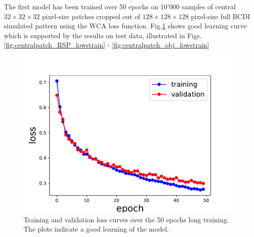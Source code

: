The first model has been trained over 50 epochs on 10'000 samples of central $32\times32\times32$ pixel-size patches 
cropped out of $128\times128\times128$ pixel-size full BCDI simulated pattern using the WCA loss function. 
Fig.\ref{fig:loss_3D_lowstrain} shows good learning curve which is supported by the results on test data, illustrated 
in Figs. \ref{fig:centralpatch_RSP_lowstrain} - \ref{fig:centralpatch_obj_lowstrain}

\begin{figure}[H]
    \centering
    \includegraphics[width=\textwidth]{figures/Phasing/loss_central_patch.pdf}
    \caption{Training and validation loss curves over the 50 epochs long training. The plots indicate a good learning 
    of the model.}
    
    \label{fig:loss_3D_lowstrain}

\end{figure}

